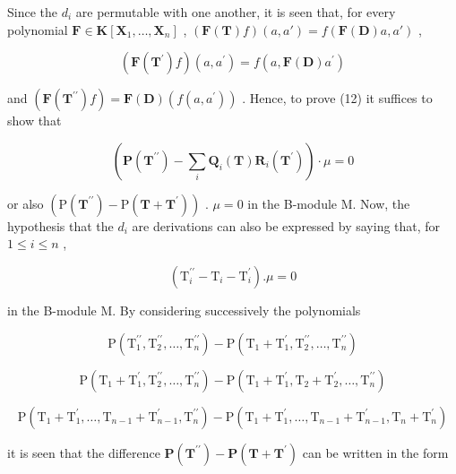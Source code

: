 Since the \(d_{i}\) are permutable with one another, it is seen that, for every polynomial \(\mathbf{F} \in \mathbf{K}[\mathbf{X}_{1}, \ldots, \mathbf{X}_{n}]\) , \((\mathbf{F}(\mathbf{T})f)(a, a') = f(\mathbf{F}(\mathbf{D})a, a')\) ,

\[
(\mathbf {F} (\mathbf {T} ^ {\prime}) f) (a, a ^ {\prime}) = f (a, \mathbf {F} (\mathbf {D}) a ^ {\prime})
\]

and \((\mathbf{F}(\mathbf{T}^{\prime \prime})f) = \mathbf{F}(\mathbf{D})(f(a,a^{\prime}))\) . Hence, to prove (12) it suffices to show that

\[
(\mathbf {P} (\mathbf {T} ^ {\prime \prime}) - \sum_ {i} \mathbf {Q} _ {i} (\mathbf {T}) \mathbf {R} _ {i} (\mathbf {T} ^ {\prime})) \cdot \mu = 0\tag{14}
\]

or also \((\mathrm{P}(\mathbf{T}^{\prime\prime}) - \mathrm{P}(\mathbf{T} + \mathbf{T}^{\prime}))\) . \(\mu = 0\) in the B-module M. Now, the hypothesis that the \(d_{i}\) are derivations can also be expressed by saying that, for \(1 \leqslant i \leqslant n\) ,

\[
\left(\mathrm{T} _ {i} ^ {\prime \prime} - \mathrm{T} _ {i} - \mathrm{T} _ {i} ^ {\prime}\right). \mu = 0\tag{15}
\]

in the B-module M. By considering successively the polynomials

\[
\mathrm{P} \left(\mathrm{T} _ {1} ^ {\prime \prime}, \mathrm{T} _ {2} ^ {\prime \prime}, \dots , \mathrm{T} _ {n} ^ {\prime \prime}\right) - \mathrm{P} \left(\mathrm{T} _ {1} + \mathrm{T} _ {1} ^ {\prime}, \mathrm{T} _ {2} ^ {\prime \prime}, \dots , \mathrm{T} _ {n} ^ {\prime \prime}\right)
\]

\[
\mathrm{P} \left(\mathrm{T} _ {1} + \mathrm{T} _ {1} ^ {\prime}, \mathrm{T} _ {2} ^ {\prime \prime}, \dots , \mathrm{T} _ {n} ^ {\prime \prime}\right) - \mathrm{P} \left(\mathrm{T} _ {1} + \mathrm{T} _ {1} ^ {\prime}, \mathrm{T} _ {2} + \mathrm{T} _ {2} ^ {\prime}, \dots , \mathrm{T} _ {n} ^ {\prime \prime}\right)
\]

\[
\mathrm{P} \left(\mathrm{T} _ {1} + \mathrm{T} _ {1} ^ {\prime}, \dots , \mathrm{T} _ {n - 1} + \mathrm{T} _ {n - 1} ^ {\prime}, \mathrm{T} _ {n} ^ {\prime \prime}\right) - \mathrm{P} \left(\mathrm{T} _ {1} + \mathrm{T} _ {1} ^ {\prime}, \dots , \mathrm{T} _ {n - 1} + \mathrm{T} _ {n - 1} ^ {\prime}, \mathrm{T} _ {n} + \mathrm{T} _ {n} ^ {\prime}\right)
\]

it is seen that the difference \(\mathbf{P}(\mathbf{T}^{\prime \prime}) - \mathbf{P}(\mathbf{T} + \mathbf{T}^{\prime})\) can be written in the form

